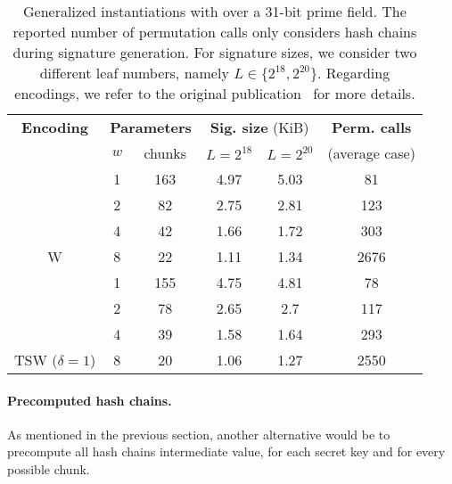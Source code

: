 
\renewcommand\arraystretch{1.25}
\begin{table}[h]
	\centering
	\begin{tabular}{cccccc}
		\toprule
    		\textbf{Encoding} & \multicolumn{2}{c}{\textbf{Parameters}} & \multicolumn{2}{c}{\textbf{Sig. size} (KiB)}  & \textbf{Perm. calls} \\
    		 & {$w$} & chunks  & $L=2^{18}$ & $ L=2^{20}$ & (average case)   \\
    		\midrule
	     &  1 & 163 & 4.97 & 5.03 & 81    \\
	     &  2 & 82  & 2.75 & 2.81 & 123 \\
	     &  4 & 42  & 1.66 & 1.72 & 303 \\
	 \multirow{-4}{*}{W}  & 8 & 22 & 1.11 & 1.34 & 2676 \\
	 \midrule
 	   &  1 & 155 & 4.75 & 4.81 & 78   \\
	   &  2 & 78  & 2.65 & 2.7  & 117  \\
	   &  4 & 39  & 1.58 & 1.64 & 293  \\
	 \multirow{-4}{*}{TSW ($\delta = 1$)}  &  8 & 20 & 1.06 & 1.27 & 2550  \\
	\hline
	\end{tabular}
	\caption{Generalized \XMSS instantiations with \PoseidonTwo over a 31-bit prime field. The reported number of permutation calls only considers hash chains during signature generation. For signature sizes, we consider two different leaf numbers, namely $L \in \{2^{18}, 2^{20}\}$. Regarding encodings, we refer to the original publication~\cite{cryptoeprint:2025/055} for more details.\label{tab:xmss_poseidon2_permcalls}}
\end{table}


\paragraph{Precomputed hash chains.}
As mentioned in the previous section, another alternative would be to precompute all hash chains intermediate value, for each secret key and for every possible chunk.

